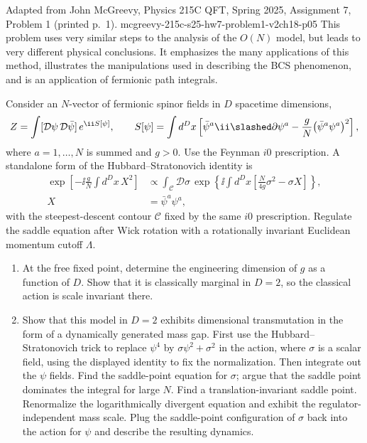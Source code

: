 \begin{enumerate}
  {Adapted from John McGreevy, Physics 215C QFT, Spring 2025,
  Assignment 7, Problem 1 (printed p.~1).}
  {mcgreevy-215c-s25-hw7-problem1-v2ch18-p05}
  This problem uses very similar steps to the analysis of the \(O(N)\)
  model, but leads to very different physical conclusions.  It emphasizes
  the many applications of this method, illustrates the manipulations used
  in describing the BCS phenomenon, and is an application of fermionic path
  integrals.

  Consider an \(N\)-vector of fermionic spinor fields in \(D\) spacetime
  dimensions,
  \[
    Z=\int[\mathcal D\psi\,\mathcal D\bar\psi]\,e^{\ii S[\psi]},
    \qquad
    S[\psi]=\int d^Dx\left[
      \bar\psi^{a}\ii\slashed\partial\psi^{a}
      -\frac{g}{N}\bigl(\bar\psi^{a}\psi^{a}\bigr)^2
    \right],
  \]
  where \(a=1,\ldots,N\) is summed and \(g>0\).  Use the Feynman
  \(i0\) prescription.  A standalone form of the Hubbard--Stratonovich
  identity is
  \[
    \begin{aligned}
      \exp\left[-\ii\frac{g}{N}\int d^Dx\,X^2\right]
      &\propto\int_{\mathcal C}\mathcal D\sigma\,
        \exp\left\{\ii\int d^Dx\left[
          \frac{N}{4g}\sigma^2-\sigma X
        \right]\right\},\\
      X&=\bar\psi^a\psi^a,
    \end{aligned}
  \]
  with the steepest-descent contour \(\mathcal C\) fixed by the same
  \(i0\) prescription.  Regulate the saddle equation after Wick rotation
  with a rotationally invariant Euclidean momentum cutoff \(\Lambda\).
  \begin{enumerate}
    \item[(a)] At the free fixed point, determine the engineering dimension
    of \(g\) as a function of \(D\).  Show that it is classically marginal
    in \(D=2\), so the classical action is scale invariant there.
    \item[(b)] Show that this model in \(D=2\) exhibits dimensional
    transmutation in the form of a dynamically generated mass gap.  First
    use the Hubbard--Stratonovich trick to replace \(\psi^4\) by
    \(\sigma\psi^2+\sigma^2\) in the action, where \(\sigma\) is a scalar
    field, using the displayed identity to fix the normalization.  Then
    integrate out the \(\psi\) fields.  Find the saddle-point equation for
    \(\sigma\); argue that the saddle point dominates the integral for large
    \(N\).  Find a translation-invariant saddle point.  Renormalize the
    logarithmically divergent equation and exhibit the regulator-independent
    mass scale.  Plug the saddle-point configuration of \(\sigma\) back into
    the action for \(\psi\) and describe the resulting dynamics.
  \end{enumerate}


\end{enumerate}
